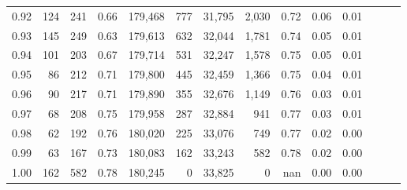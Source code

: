\begin{tabular}{rrrrrrrrrrrrrr}
0.92 &    124 &  241 &  0.66 &  179,468 &      777 &  31,795 &   2,030 &  0.72 &  0.06 &      0.01 \\
0.93 &    145 &  249 &  0.63 &  179,613 &      632 &  32,044 &   1,781 &  0.74 &  0.05 &      0.01 \\
0.94 &    101 &  203 &  0.67 &  179,714 &      531 &  32,247 &   1,578 &  0.75 &  0.05 &      0.01 \\
0.95 &     86 &  212 &  0.71 &  179,800 &      445 &  32,459 &   1,366 &  0.75 &  0.04 &      0.01 \\
0.96 &     90 &  217 &  0.71 &  179,890 &      355 &  32,676 &   1,149 &  0.76 &  0.03 &      0.01 \\
0.97 &     68 &  208 &  0.75 &  179,958 &      287 &  32,884 &     941 &  0.77 &  0.03 &      0.01 \\
0.98 &     62 &  192 &  0.76 &  180,020 &      225 &  33,076 &     749 &  0.77 &  0.02 &      0.00 \\
0.99 &     63 &  167 &  0.73 &  180,083 &      162 &  33,243 &     582 &  0.78 &  0.02 &      0.00 \\
1.00 &    162 &  582 &  0.78 &  180,245 &        0 &  33,825 &       0 &   nan &  0.00 &      0.00 \\
\bottomrule
\end{tabular}
